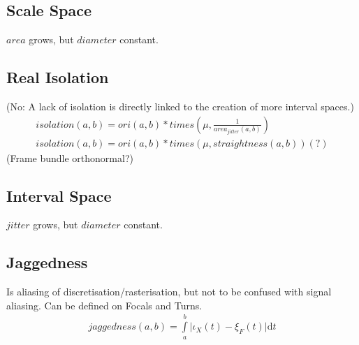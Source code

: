 \documentclass{report}
\begin{document}
\subsection*{Scale Space}
$area$ grows, but $diameter$ constant.

\subsection{Real Isolation}
(No: A lack of isolation is directly linked to the creation of more interval spaces.)
\begin{align}
isolation(a,b) = ori(a,b)*times(\mu,\frac{1}{area_{jitter}(a,b)})\\
isolation(a,b) = ori(a,b)*times(\mu,straightness(a,b))(?)
\end{align}
(Frame bundle orthonormal?)
\subsection*{Interval Space}
$jitter$ grows, but $diameter$ constant.

\subsection{Jaggedness}
Is aliasing of discretisation/rasterisation, but not to be confused with signal aliasing. Can be defined on Focals and Turns.
\begin{align}
jaggedness(a,b)=\int \limits _{a}^{b} \lvert \iota_{X}(t)-\xi_{F}(t)\rvert \mathrm{d}t
\end{align}
\end{document}
